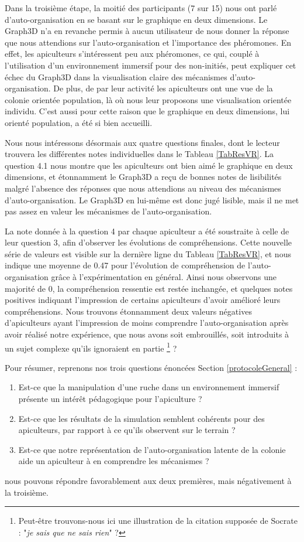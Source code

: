     Dans la troisième étape, la moitié des participants (7 sur 15) nous ont parlé d'auto-organisation en se basant sur le graphique en deux dimensions. Le Graph3D n'a en revanche permis à aucun utilisateur de nous donner la réponse que nous attendions sur l'auto-organisation et l'importance des phéromones. 
En effet, les apiculteurs s'intéressent peu aux phéromones, ce qui, couplé à l'utilisation d'un environnement immersif pour des non-initiés, peut expliquer cet échec du Graph3D dans la visualisation claire des mécanismes d'auto-organisation. De plus, de par leur activité les apiculteurs ont une vue de la colonie orientée population, là où nous leur proposons une visualisation orientée individu. C'est aussi pour cette raison que le graphique en deux dimensions, lui orienté population, a été si bien accueilli.

	Nous nous intéressons désormais aux quatre questions finales, dont le lecteur trouvera les différentes notes individuelles dans le Tableau \ref{TabResVR}. La question 4.1 nous montre que les apiculteurs ont bien aimé le graphique en deux dimensions, et étonnamment le Graph3D a reçu de bonnes notes de lisibilités malgré l'absence des réponses que nous attendions au niveau des mécanismes d'auto-organisation. Le Graph3D en lui-même est donc jugé lisible, mais il ne met pas assez en valeur les mécanismes de l'auto-organisation. 
	
	La note donnée à la question 4 par chaque apiculteur a été soustraite à celle de leur question 3, afin d'observer les évolutions de compréhensions. Cette nouvelle série de valeurs est visible sur la dernière ligne du Tableau \ref{TabResVR}, et nous indique une moyenne de 0.47 pour l'évolution de compréhension de l'auto-organisation grâce à l'expérimentation en général. 
	Ainsi nous observons une majorité de 0, la compréhension ressentie est restée inchangée, et quelques notes positives indiquant l'impression de certains apiculteurs d'avoir amélioré leurs compréhensions. Nous trouvons étonnamment deux valeurs négatives d'apiculteurs ayant l'impression de moins comprendre l'auto-organisation après avoir réalisé notre expérience, que nous avons soit embrouillés, soit introduits à un sujet complexe qu'ils ignoraient en partie \footnote{Peut-être trouvons-nous ici une illustration de la citation supposée de Socrate : "\textit{je sais que ne sais rien}" ?} ?
	
	Pour résumer, reprenons nos trois questions énoncées Section \ref{protocoleGeneral} : 
		\begin{enumerate}
			\item Est-ce que la manipulation d'une ruche dans un environnement immersif présente un intérêt pédagogique pour l'apiculture ?
			\item Est-ce que les résultats de la simulation semblent cohérents pour des apiculteurs, par rapport à ce qu'ils observent sur le terrain ?
			\item Est-ce que notre représentation de l'auto-organisation latente de la colonie aide un apiculteur à en comprendre les mécanismes ?
		\end{enumerate}	
	 nous pouvons répondre favorablement aux deux premières, mais négativement à la troisième.
	 
